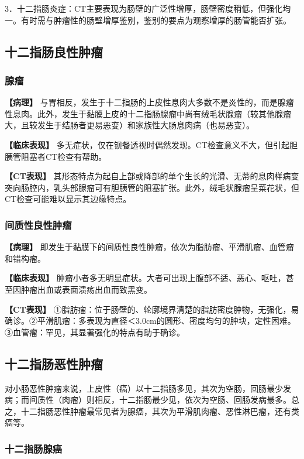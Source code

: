 3．十二指肠炎症：CT主要表现为肠壁的广泛性增厚，肠壁密度稍低，但强化均一。有时需与肿瘤性的肠壁增厚鉴别，鉴别的要点为观察增厚的肠管能否扩张。

\subsection{十二指肠良性肿瘤}

\subsubsection{腺瘤}

\textbf{【病理】}
与胃相反，发生于十二指肠的上皮性息肉大多数不是炎性的，而是腺瘤性息肉。此外，发生于黏膜上皮的十二指肠腺瘤中尚有绒毛状腺瘤（较其他腺瘤大，且较发生于结肠者更易恶变）和家族性大肠息肉病（也易恶变）。

\textbf{【临床表现】}
多无症状，仅在钡餐透视时偶然发现。CT检查意义不大，但引起胆胰管阻塞者CT检查有帮助。

\textbf{【CT表现】}
其形态特点为起自上部或降部的单个生长的光滑、无蒂的息肉样病变突向肠腔内，乳头部腺瘤可有胆胰管的阻塞扩张。此外，绒毛状腺瘤呈菜花状，但CT检查可能难以显示其边缘特点。

\subsubsection{间质性良性肿瘤}

\textbf{【病理】}
即发生于黏膜下的间质性良性肿瘤，依次为脂肪瘤、平滑肌瘤、血管瘤和错构瘤。

\textbf{【临床表现】}
肿瘤小者多无明显症状。大者可出现上腹部不适、恶心、呕吐，甚至因肿瘤出血或表面溃疡出血而致黑变。

\textbf{【CT表现】}
①脂肪瘤：位于肠壁的、轮廓境界清楚的脂肪密度肿物，无强化，易确诊。②平滑肌瘤：多表现为直径＜3.0cm的圆形、密度均匀的肿块，定性困难。③血管瘤：罕见，其显著强化的特点有助于确诊。

\subsection{十二指肠恶性肿瘤}

对小肠恶性肿瘤来说，上皮性（癌）以十二指肠多见，其次为空肠，回肠最少发病；而间质性（肉瘤）则相反，十二指肠最少见，依次为空肠、回肠发病最多。总之，十二指肠恶性肿瘤最常见者为腺癌，其次为平滑肌肉瘤、恶性淋巴瘤，还有类癌等。

\subsubsection{十二指肠腺癌}

